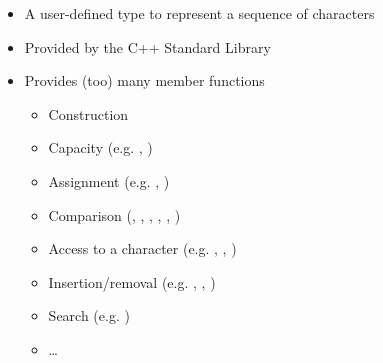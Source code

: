 \begin{frame}[fragile]{ \insertcontinuationtext}

  \begin{itemize}

  \item A user-defined type to represent a sequence of characters
  \item Provided by the C++ Standard Library
  \item Provides (too) many member functions
    \begin{itemize}
    \item Construction
    \item Capacity (e.g. , )
    \item Assignment (e.g. \code{=}, )
    \item Comparison (\code{==}, \code{!=}, \code{<}, \code{>}, \code{<=}, \code{>=})
    \item Access to a character (e.g. \code{[]}, , )
    \item Insertion/removal (e.g. , , )
    \item Search (e.g. )
    \item \ldots
    \end{itemize}
  \end{itemize}

\end{frame}

